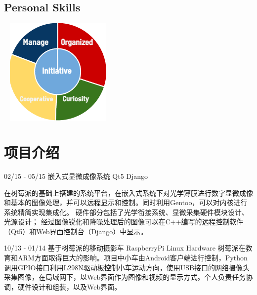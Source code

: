 \documentclass[]{friggeri-cv}
\begin{document}
\begin{aside}
  \section{Personal Skills}
    ~
    \includegraphics[scale=0.72]{img/personal.png}
    ~
\end{aside}

\section{项目介绍}
\begin{entrylist}
  \entry
    {02/15 - 05/15}
    {嵌入式显微成像系统}
    {Qt5 Django }
    {在树莓派的基础上搭建的系统平台，在嵌入式系统下对光学薄膜进行数字显微成像和基本的图像处理，并可以远程显示和控制。同时利用Gentoo，可以对内核进行系统精简实现集成化。
     硬件部分包括了光学衔接系统、显微采集硬件模块设计、光源设计；%
     经过图像锐化和降噪处理后的图像可以在C++编写的远程控制软件（Qt5）和Web界面控制台（Django）中显示。
     
    }

   \entry
   {10/13 - 01/14}
   {基于树莓派的移动摄影车}
   {RaspberryPi  Linux  Hardware}
   {
    树莓派在教育和ARM方面取得巨大的影响。项目中小车由Android客户端进行控制，Python调用GPIO接口利用L298N驱动板控制小车运动方向，使用USB接口的网络摄像头采集图像，在局域网下，以Web界面作为图像和视频的显示方式。个人负责任务协调，硬件设计和组装，以及Web界面。
   }
   
\end{entrylist}
\end{document}
